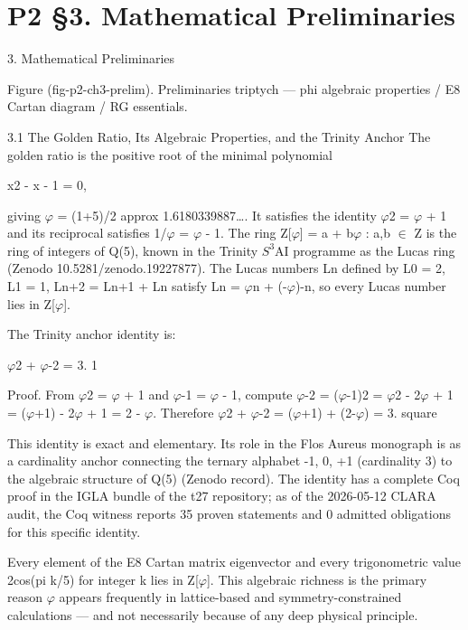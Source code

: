 
\section{P2 §3. Mathematical Preliminaries}

3. Mathematical Preliminaries

  Figure (fig-p2-ch3-prelim). Preliminaries triptych --- phi algebraic properties / E8 Cartan diagram
                                            / RG essentials.

  3.1 The Golden Ratio, Its Algebraic Properties, and the Trinity
  Anchor
  The golden ratio is the positive root of the minimal polynomial

  x2 - x - 1 = 0,

  giving $\varphi$ = (1+5)/2 approx 1.6180339887…. It satisfies the identity $\varphi$2 = $\varphi$ + 1 and its
  reciprocal satisfies 1/$\varphi$ = $\varphi$ - 1. The ring Z[$\varphi$] = {a + b$\varphi$ : a,b $\in$ Z} is the ring of integers
  of Q(5), known in the Trinity $S^{3}$AI programme as the Lucas ring (Zenodo
  10.5281/zenodo.19227877). The Lucas numbers Ln defined by L0 = 2, L1 = 1, Ln+2 =
  Ln+1 + Ln satisfy Ln = $\varphi$n + (-$\varphi$)-n, so every Lucas number lies in Z[$\varphi$].

  The Trinity anchor identity is:

  $\varphi$2 + $\varphi$-2 = 3. 1

        Proof. From $\varphi$2 = $\varphi$ + 1 and $\varphi$-1 = $\varphi$ - 1, compute $\varphi$-2 = ($\varphi$-1)2 = $\varphi$2 - 2$\varphi$ + 1 =
        ($\varphi$+1) - 2$\varphi$ + 1 = 2 - $\varphi$. Therefore $\varphi$2 + $\varphi$-2 = ($\varphi$+1) + (2-$\varphi$) = 3. square

  This identity is exact and elementary. Its role in the Flos Aureus monograph is as a
  cardinality anchor connecting the ternary alphabet {-1, 0, +1} (cardinality 3) to the
  algebraic structure of Q(5) (Zenodo record). The identity has a complete Coq proof in
  the IGLA bundle of the t27 repository; as of the 2026-05-12 CLARA audit, the Coq
  witness reports 35 proven statements and 0 admitted obligations for this specific
  identity.

  Every element of the E8 Cartan matrix eigenvector and every trigonometric value
  2cos(pi k/5) for integer k lies in Z[$\varphi$]. This algebraic richness is the primary reason $\varphi$
  appears frequently in lattice-based and symmetry-constrained calculations --- and not
  necessarily because of any deep physical principle.

